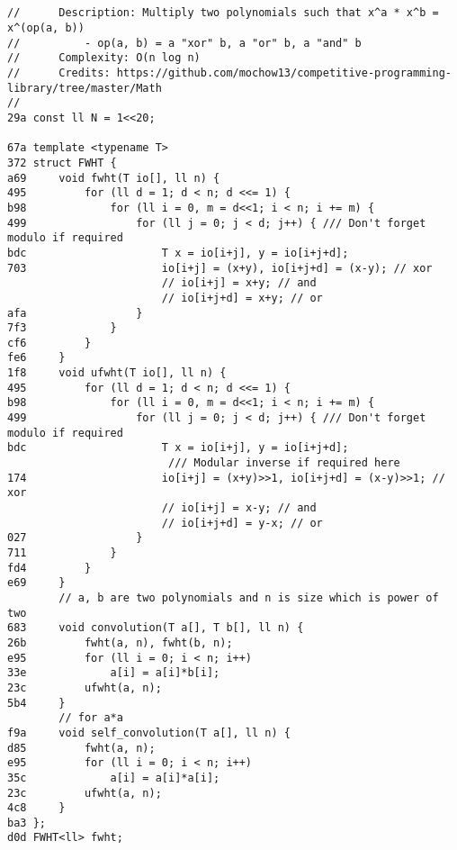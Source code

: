 \documentclass[11pt, a4paper, twoside]{article}
\begin{document}
\subsection{}
\begin{lstlisting}
//      Description: Multiply two polynomials such that x^a * x^b = x^(op(a, b))
//      	- op(a, b) = a "xor" b, a "or" b, a "and" b
//      Complexity: O(n log n)
//      Credits: https://github.com/mochow13/competitive-programming-library/tree/master/Math
//
29a const ll N = 1<<20;

67a template <typename T>
372 struct FWHT {
a69 	void fwht(T io[], ll n) {
495 		for (ll d = 1; d < n; d <<= 1) {
b98 			for (ll i = 0, m = d<<1; i < n; i += m) {
499 				for (ll j = 0; j < d; j++) { /// Don't forget modulo if required
bdc 					T x = io[i+j], y = io[i+j+d];
703 					io[i+j] = (x+y), io[i+j+d] = (x-y);	// xor
    					// io[i+j] = x+y; // and
    					// io[i+j+d] = x+y; // or
afa 				}
7f3 			}
cf6 		}
fe6 	}
1f8 	void ufwht(T io[], ll n) {
495 		for (ll d = 1; d < n; d <<= 1) {
b98 			for (ll i = 0, m = d<<1; i < n; i += m) {
499 				for (ll j = 0; j < d; j++) { /// Don't forget modulo if required
bdc 					T x = io[i+j], y = io[i+j+d];
    					 /// Modular inverse if required here
174 					io[i+j] = (x+y)>>1, io[i+j+d] = (x-y)>>1; // xor
    					// io[i+j] = x-y; // and
    					// io[i+j+d] = y-x; // or
027 				}
711 			}
fd4 		}
e69 	}
    	// a, b are two polynomials and n is size which is power of two
683 	void convolution(T a[], T b[], ll n) {
26b 		fwht(a, n), fwht(b, n);
e95 		for (ll i = 0; i < n; i++)
33e 			a[i] = a[i]*b[i];
23c 		ufwht(a, n);
5b4 	}
    	// for a*a	
f9a 	void self_convolution(T a[], ll n) {
d85 		fwht(a, n);
e95 		for (ll i = 0; i < n; i++)
35c 			a[i] = a[i]*a[i];
23c 		ufwht(a, n);
4c8 	}
ba3 };
d0d FWHT<ll> fwht;
\end{lstlisting}
\end{document}

